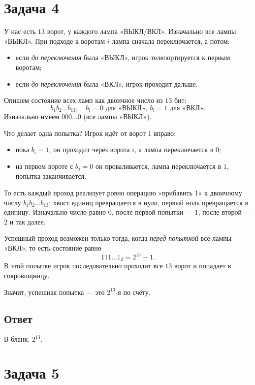 \documentclass[12pt,a4paper]{article}
\begin{document}
\newpage

\section*{Задача 4}

У нас есть $13$ ворот, у каждого лампа «ВЫКЛ/ВКЛ». Изначально все лампы «ВЫКЛ». При подходе к воротам $i$ лампа сначала переключается, а потом:
\begin{itemize}
  \item если \emph{до переключения} была «ВЫКЛ», игрок телепортируется к первым воротам;
  \item если \emph{до переключения} была «ВКЛ», игрок проходит дальше.
\end{itemize}

Опишем состояние всех ламп как двоичное число из $13$ бит:
\[
b_1 b_2 \dots b_{13},\quad b_i = 0 \text{ для «ВЫКЛ», } b_i = 1 \text{ для «ВКЛ».}
\]
Изначально имеем $000\ldots0$ (все лампы «ВЫКЛ»).

Что делает одна попытка? Игрок идёт от ворот 1 вправо:
\begin{itemize}
  \item пока $b_i = 1$, он проходит через ворота $i$, а лампа переключается в $0$;
  \item на первом вороте с $b_j = 0$ он проваливается, лампа переключается в $1$, попытка заканчивается.
\end{itemize}

То есть каждый проход реализует ровно операцию «прибавить 1» к двоичному числу $b_1 b_2 \dots b_{13}$: хвост единиц превращается в нули, первый ноль превращается в единицу. Изначально число равно $0$, после первой попытки --- $1$, после второй --- $2$ и так далее.

Успешный проход возможен только тогда, когда \emph{перед попыткой} все лампы «ВКЛ», то есть состояние равно
\[
111\ldots1_2 = 2^{13}-1.
\]
В этой попытке игрок последовательно проходит все $13$ ворот и попадает в сокровищницу.

Значит, успешная попытка --- это $2^{13}$-я по счёту.

\subsection*{Ответ}
В бланк: $2^{13}$.
\newpage

\section*{Задача 5}
\end{document}
